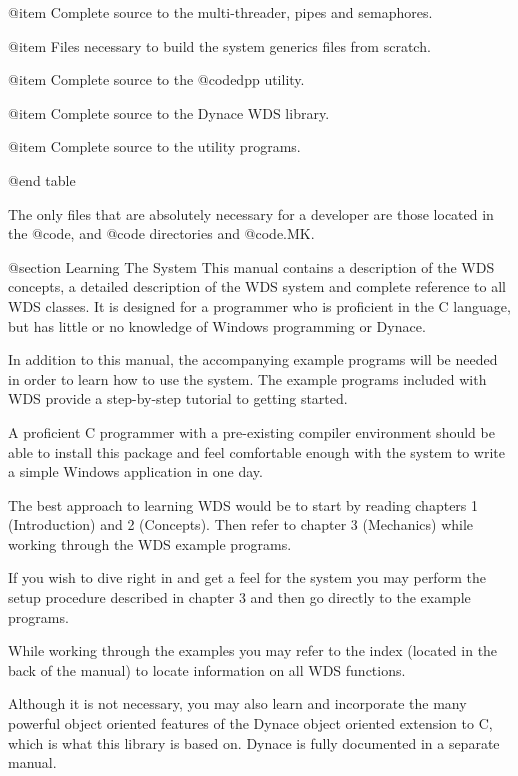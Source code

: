 @item \DYNACE\THREADS
Complete source to the multi-threader, pipes and semaphores.

@item \DYNACE\GENERICS
Files necessary to build the system generics files from scratch.

@item \DYNACE\DPP
Complete source to the @code{dpp} utility.

@item \DYNACE\WINDOWS
Complete source to the Dynace WDS library.

@item \DYNACE\UTILS
Complete source to the utility programs.

@end table



The only files that are absolutely necessary for a developer are those
located in the @code{\DYNACE\LIB, \DYNACE\INCLUDE} and @code{\DYNACE\BIN}
directories and @code{\DYNACE\UTILS\STARTUP.MK}.





@section Learning The System
This manual contains a description of the WDS concepts, a detailed
description of the WDS system and complete reference to all WDS classes.
It is designed for a programmer who is proficient in the C language, but
has little or no knowledge of Windows programming or Dynace.


In addition to this manual, the accompanying example programs will be
needed in order to learn how to use the system.  The example programs
included with WDS provide a step-by-step tutorial to getting started.


A proficient C programmer with a pre-existing compiler environment
should be able to install this package and feel comfortable enough with
the system to write a simple Windows application in one day.


The best approach to learning WDS would be to start by reading chapters
1 (Introduction) and 2 (Concepts).  Then refer to chapter 3 (Mechanics)
while working through the WDS example programs.

If you wish to dive right in and get a feel for the system you may
perform the setup procedure described in chapter 3 and then go directly
to the example programs.

While working through the examples you may refer to the index (located
in the back of the manual) to locate information on all WDS functions.

Although it is not necessary, you may also learn and incorporate the
many powerful object oriented features of the Dynace object oriented
extension to C, which is what this library is based on.  Dynace is fully
documented in a separate manual.






